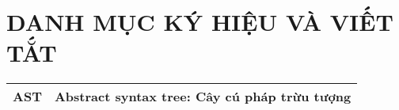 \chapter*{DANH MỤC KÝ HIỆU VÀ VIẾT TẮT}
\begin{longtable}{| p{2cm} | p{10cm} |}
\hline
AST & Abstract syntax tree: Cây cú pháp trừu tượng\\
\hline
\end{longtable}
